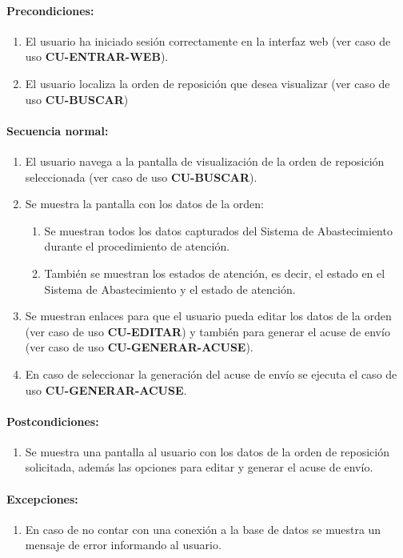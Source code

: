 \paragraph{Precondiciones:}
\begin{enumerate}
  \item El usuario ha iniciado sesión correctamente en la interfaz web (ver caso de uso \textbf{CU-ENTRAR-WEB}).
  \item El usuario localiza la orden de reposición que desea visualizar (ver caso de uso \textbf{CU-BUSCAR})
\end{enumerate}
\paragraph{Secuencia normal:}
\begin{enumerate}
  \item El usuario navega a la pantalla de visualización de la orden de reposición seleccionada (ver caso de uso \textbf{CU-BUSCAR}).
  \item Se muestra la pantalla con los datos de la orden:
  \begin{enumerate}
    \item Se muestran todos los datos capturados del Sistema de Abastecimiento durante el procedimiento de atención.
    \item También se muestran los estados de atención, es decir, el estado en el Sistema de Abastecimiento  y el estado de atención.
  \end{enumerate}
  \item Se muestran enlaces para que el usuario pueda editar los datos de la orden (ver caso de uso \textbf{CU-EDITAR}) y también para generar el acuse de envío (ver caso de uso \textbf{CU-GENERAR-ACUSE}).
  \item En caso de seleccionar la generación del acuse de envío se ejecuta el caso de uso \textbf{CU-GENERAR-ACUSE}.
\end{enumerate}
\paragraph{Postcondiciones:}
\begin{enumerate}
  \item Se muestra una pantalla al usuario con los datos de la orden de reposición solicitada, además las opciones para editar y generar el acuse de envío.
\end{enumerate}
\paragraph{Excepciones:}
\begin{enumerate}
  \item En caso de no contar con una conexión a la base de datos se muestra un mensaje de error informando al usuario.
\end{enumerate}


